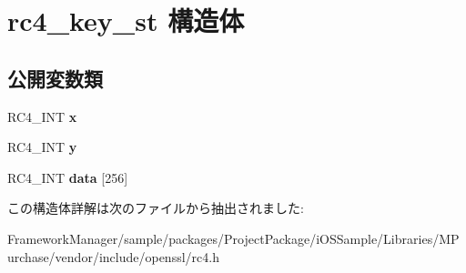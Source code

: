 \hypertarget{structrc4__key__st}{}\section{rc4\+\_\+key\+\_\+st 構造体}
\label{structrc4__key__st}
\subsection*{公開変数類}
\begin{DoxyCompactItemize}
\item 
\hypertarget{structrc4__key__st_a0d6aa0ac8fc40a7d1464aee47b5e776d}{}R\+C4\+\_\+\+I\+N\+T {\bfseries x}\label{structrc4__key__st_a0d6aa0ac8fc40a7d1464aee47b5e776d}

\item 
\hypertarget{structrc4__key__st_a9c19462d7de7a357d2922a3d94f89c0d}{}R\+C4\+\_\+\+I\+N\+T {\bfseries y}\label{structrc4__key__st_a9c19462d7de7a357d2922a3d94f89c0d}

\item 
\hypertarget{structrc4__key__st_aed926f06ad89470f035e17200a12b659}{}R\+C4\+\_\+\+I\+N\+T {\bfseries data} \mbox{[}256\mbox{]}\label{structrc4__key__st_aed926f06ad89470f035e17200a12b659}

\end{DoxyCompactItemize}


この構造体詳解は次のファイルから抽出されました\+:\begin{DoxyCompactItemize}
\item 
Framework\+Manager/sample/packages/\+Project\+Package/i\+O\+S\+Sample/\+Libraries/\+M\+Purchase/vendor/include/openssl/rc4.\+h\end{DoxyCompactItemize}

